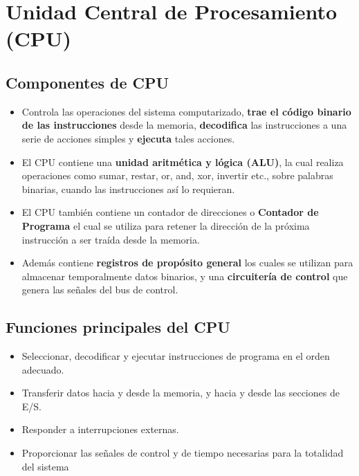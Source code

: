 \documentclass[11pt]{article}
\begin{document}
\section{Unidad Central de Procesamiento (CPU)}
\label{sec:org2ee81dc}
\subsection{Componentes de CPU}
\label{sec:orgbd129ac}
\begin{itemize}
\item Controla las operaciones del sistema computarizado, \textbf{trae el código binario de las instrucciones} desde la memoria, \textbf{decodifica} las instrucciones a una serie de acciones simples y \textbf{ejecuta} tales acciones.

\item El CPU contiene una \textbf{unidad aritmética y lógica (ALU)}, la cual realiza operaciones como sumar, restar, or, and, xor, invertir etc., sobre palabras binarias, cuando las instrucciones así lo requieran.

\item El CPU también contiene un contador de direcciones o \textbf{Contador de Programa} el cual se utiliza para retener la dirección de la próxima instrucción a ser traída desde la memoria.

\item Además contiene \textbf{registros de propósito general} los cuales se utilizan para almacenar temporalmente datos binarios, y una \textbf{circuitería de control} que genera las señales del bus de control.
\end{itemize}

\subsection{Funciones principales del CPU}
\label{sec:orgbe77135}
\begin{itemize}
\item Seleccionar, decodificar y ejecutar instrucciones de programa en el orden adecuado.

\item Transferir datos hacia y desde la memoria, y hacia y desde las secciones de E/S.

\item Responder a interrupciones externas.

\item Proporcionar las señales de control y de tiempo necesarias para la totalidad del sistema
\end{itemize}
\end{document}
